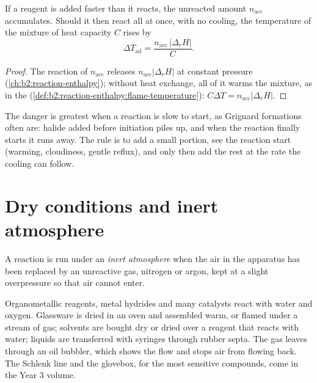 \begin{proposition}[Accumulation]\label{prop:b2:lab-techniques-2:accumulation}
If a reagent is added faster than it reacts, the unreacted amount $n_{\mathrm{acc}}$ accumulates. Should
it then react all at once, with no cooling, the temperature of the mixture of heat capacity $C$ rises by
\begin{equation*}
\Delta T_{\mathrm{ad}} = \frac{n_{\mathrm{acc}}\,|\Delta_rH|}{C}.
\end{equation*}
\end{proposition}

\begin{proof}
The reaction of $n_{\mathrm{acc}}$ releases $n_{\mathrm{acc}}|\Delta_rH|$ at constant pressure
(\cref{ch:b2:reaction-enthalpy}); without heat exchange, all of it warms the mixture, as in the
 (\cref{def:b2:reaction-enthalpy:flame-temperature}): $C\Delta T =
n_{\mathrm{acc}}|\Delta_rH|$.
\end{proof}

The danger is greatest when a reaction is slow to start, as Grignard formations often are: halide added
before initiation piles up, and when the reaction finally starts it runs away. The rule is to add a small
portion, see the reaction start (warming, cloudiness, gentle reflux), and only then add the rest at the
rate the cooling can follow.

\section{Dry conditions and inert atmosphere}

\begin{definition}\label{def:b2:lab-techniques-2:inert}
A reaction is run under an \emph{inert atmosphere} when the air in the apparatus
has been replaced by an unreactive gas, nitrogen or argon, kept at a slight overpressure so that air
cannot enter.
\end{definition}

Organometallic reagents, metal hydrides and many catalysts react with water and oxygen. Glassware is
dried in an oven and assembled warm, or flamed under a stream of gas; solvents are bought dry or dried
over a reagent that reacts with water; liquids are transferred with syringes through rubber septa.
The gas leaves through an oil bubbler, which shows the flow and stops air from flowing back. The
Schlenk line and the glovebox, for the most sensitive compounds, come in the Year 3 volume.


